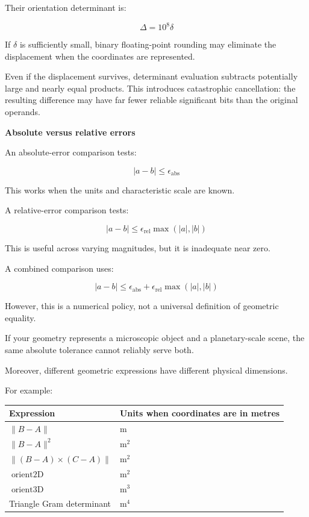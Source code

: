 Their orientation determinant is:

\[
\Delta=10^8\delta
\]

If \(\delta\) is sufficiently small, binary floating-point rounding may eliminate the displacement when the coordinates are represented.

Even if the displacement survives, determinant evaluation subtracts potentially large and nearly equal products. This introduces catastrophic cancellation: the resulting difference may have far fewer reliable significant bits than the original operands.

\textbf{Absolute versus relative errors}

An absolute-error comparison tests:

\[
|a-b|\le\epsilon_{\mathrm{abs}}
\]

This works when the units and characteristic scale are known.

A relative-error comparison tests:

\[
|a-b|\le\epsilon_{\mathrm{rel}} \max(|a|,|b|)
\]

This is useful across varying magnitudes, but it is inadequate near zero.

A combined comparison uses:

\[
|a-b| \le \epsilon_{\mathrm{abs}} + \epsilon_{\mathrm{rel}}\max(|a|,|b|)
\]

However, this is a numerical policy, not a universal definition of geometric equality.

If your geometry represents a microscopic object and a planetary-scale scene, the same absolute tolerance cannot reliably serve both.

Moreover, different geometric expressions have different physical dimensions.

For example:

{\def\LTcaptype{none} %
\begin{longtable}[]{@{}
  >{\raggedright\arraybackslash}p{}
  >{\raggedright\arraybackslash}p{}@{}}
\toprule\noalign{}
\begin{minipage}[b]{\linewidth}\raggedright
Expression
\end{minipage} & \begin{minipage}[b]{\linewidth}\raggedright
Units when coordinates are in metres
\end{minipage} \\
\midrule\noalign{}
\endhead
\bottomrule\noalign{}
\endlastfoot
\(\|B-A\|\) & \(\mathrm m\) \\
\(\|B-A\|^2\) & \(\mathrm m^2\) \\
\(\|(B-A)\times(C-A)\|\) & \(\mathrm m^2\) \\
\(\operatorname{orient2D}\) & \(\mathrm m^2\) \\
\(\operatorname{orient3D}\) & \(\mathrm m^3\) \\
Triangle Gram determinant & \(\mathrm m^4\) \\
\end{longtable}
}

